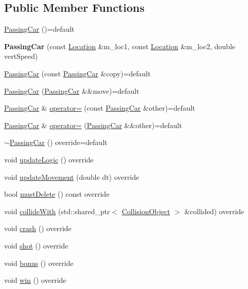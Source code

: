 \subsection*{Public Member Functions}
\begin{DoxyCompactItemize}
\item 
\hyperlink{classroadfighter_1_1PassingCar_af071c33cd301f1558054423d30b0b0fd}{Passing\+Car} ()=default
\item 
\mbox{\label{classroadfighter_1_1PassingCar_a0492e46e1930b2eec14622a61d33acc2}} 
{\bfseries Passing\+Car} (const \hyperlink{classroadfighter_1_1Location}{Location} \&m\+\_\+loc1, const \hyperlink{classroadfighter_1_1Location}{Location} \&m\+\_\+loc2, double vert\+Speed)
\item 
\hyperlink{classroadfighter_1_1PassingCar_abf5e19562be7b8d2ff71557fb2027aae}{Passing\+Car} (const \hyperlink{classroadfighter_1_1PassingCar}{Passing\+Car} \&copy)=default
\item 
\hyperlink{classroadfighter_1_1PassingCar_aabea2fb415c816c0308399cd49732d83}{Passing\+Car} (\hyperlink{classroadfighter_1_1PassingCar}{Passing\+Car} \&\&move)=default
\item 
\hyperlink{classroadfighter_1_1PassingCar}{Passing\+Car} \& \hyperlink{classroadfighter_1_1PassingCar_aa3cbe5aa96205e8b7f4ba99531e47735}{operator=} (const \hyperlink{classroadfighter_1_1PassingCar}{Passing\+Car} \&other)=default
\item 
\hyperlink{classroadfighter_1_1PassingCar}{Passing\+Car} \& \hyperlink{classroadfighter_1_1PassingCar_a5cae5b484691e5975d2b9d59254108ad}{operator=} (\hyperlink{classroadfighter_1_1PassingCar}{Passing\+Car} \&\&other)=default
\item 
\hyperlink{classroadfighter_1_1PassingCar_ab590a845658cdb5aae74c0a922548aa8}{$\sim$\+Passing\+Car} () override=default
\item 
void \hyperlink{classroadfighter_1_1PassingCar_ac3fe3087290121bf44880f94efa3a916}{update\+Logic} () override
\item 
void \hyperlink{classroadfighter_1_1PassingCar_ade5ebca5d7dbdb75bd9eee5817972363}{update\+Movement} (double dt) override
\item 
bool \hyperlink{classroadfighter_1_1PassingCar_a96b365c19d4e6e940d3827319434a022}{must\+Delete} () const override
\item 
void \hyperlink{classroadfighter_1_1PassingCar_a04ee71b75c90f21efef591756855bf37}{collide\+With} (std\+::shared\+\_\+ptr$<$ \hyperlink{classroadfighter_1_1CollisionObject}{Collision\+Object} $>$ \&collided) override
\item 
void \hyperlink{classroadfighter_1_1PassingCar_a5c437fb5164d2735881a469650db048d}{crash} () override
\item 
void \hyperlink{classroadfighter_1_1PassingCar_ac04b801b789bf880011d5cdb1ffdec59}{shot} () override
\item 
void \hyperlink{classroadfighter_1_1PassingCar_a43d55e28efe840d81c1b87216920eb69}{bonus} () override
\item 
void \hyperlink{classroadfighter_1_1PassingCar_a365d8befb1c2fd34337fc25665ccc73f}{win} () override
\end{DoxyCompactItemize}


